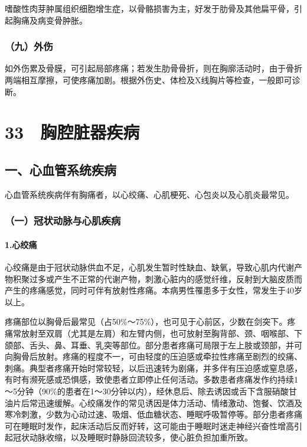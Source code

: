 嗜酸性肉芽肿属组织细胞增生症，以骨骼损害为主，好发于肋骨及其他扁平骨，引起胸痛及病变骨肿胀。

\subsubsection{（九）外伤}

如外伤累及骨膜，可引起局部疼痛；若发生肋骨骨折，则在胸廓活动时，由于骨折两端相互摩擦，可使疼痛加剧。根据外伤史、体检及X线胸片等检查，一般即可诊断。

\protect\hypertarget{text00094.html}{}{}

\section{33　胸腔脏器疾病}

\subsection{一、心血管系统疾病}

心血管系统疾病伴有胸痛者，以心绞痛、心肌梗死、心包炎以及心肌炎最常见。

\subsubsection{（一）冠状动脉与心肌疾病}

\paragraph{1.心绞痛}

心绞痛是由于冠状动脉供血不足，心肌发生暂时性缺血、缺氧，导致心肌内代谢产物积聚过多或产生不正常的代谢产物，刺激心脏内的感觉纤维，反射到大脑皮质而产生的疼痛感觉，同时可伴有放射性疼痛。本病男性罹患多于女性，常发生于40岁以上。

疼痛部位以胸骨后最常见（占50\%～75\%），也可见于心前区，少数在剑突下。疼痛常放射至双肩（尤其是左肩）和左臂内侧，也可放射至胸背部、颈、咽喉部、下颌部、舌头、鼻、耳垂、乳突等部位。部分患者疼痛可局限于左上肢或颈部，并可向胸骨后放射。疼痛的程度不一，可由轻度的压迫感或牵拉性疼痛至剧烈的绞痛、刺痛。典型者疼痛开始时常较轻，以后迅速转为剧痛，并多伴有压迫感或窒息感，有时有濒死感或恐惧感，致使患者立即停止任何活动。多数患者疼痛发作约持续1～5分钟（90\%的患者在1～30分钟以内），经休息后、除去诱因或舌下含服硝酸甘油片后常迅速缓解。心绞痛发作的常见诱因是体力活动、情绪激动、饱餐、饮酒及寒冷刺激，少数为心动过速、吸烟、低血糖状态、睡眠呼吸暂停等。部分患者疼痛可在睡眠时发作，起床活动后反而好转，这可能由于睡眠时迷走神经兴奋性增高引起冠状动脉收缩，以及睡眠时静脉回流较多，使心脏负担加重所致。

